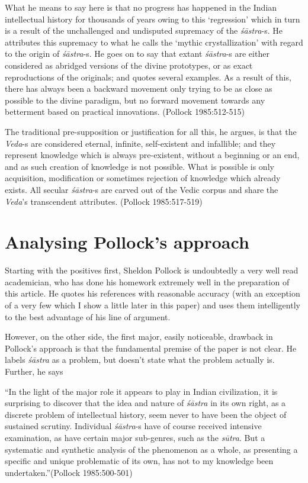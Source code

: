 What he means to say here is that no progress has happened in the Indian intellectual history for thousands of years owing to this `regression' which in turn is a result of the unchallenged and undisputed supremacy of the {\it śāstra}-s. He attributes this supremacy to what he calls the `mythic crystallization' with regard to the origin of {\it śāstra}-s. He goes on to say that extant {\it śāstra}-s are either considered as abridged versions of the divine prototypes, or as exact reproductions of the originals; and quotes several examples. As a result of this, there has always been a backward movement only trying to be as close as possible to the divine paradigm, but no forward movement towards any betterment based on practical innovations. (Pollock 1985:512-515)

The traditional pre-supposition or justification for all this, he argues, is that the {\it Veda}-s are considered eternal, infinite, self-existent and infallible; and they represent knowledge which is always pre-existent, without a beginning or an end, and as such creation of knowledge is not possible. What is possible is only acquisition, modification or sometimes rejection of knowledge which already exists. All secular {\it śāstra}-s are carved out of the Vedic corpus and share the {\it Veda}'s transcendent attributes. (Pollock 1985:517-519)

\section*{Analysing Pollock's approach}

Starting with the positives first, Sheldon Pollock is undoubtedly a very well read academician, who has done his homework extremely well in the preparation of this article. He quotes his references with reasonable accuracy (with an exception of a very few which I show a little later in this paper) and uses them intelligently to the best advantage of his line of argument. 

However, on the other side, the first major, easily noticeable, drawback in Pollock's approach is that the fundamental premise of the paper is not clear. He labels {\it śāstra} as a problem, but doesn't state what the problem actually is. Further, he says
\begin{myquote}
``In the light of the major role it appears to play in Indian civilization, it is surprising to discover that the idea and nature of {\sl śāstra} in its own right, as a discrete problem of intellectual history, seem never to have been the object of sustained scrutiny. Individual {\sl śāstra}-s have of course received intensive examination, as have certain major sub-genres, such as the {\sl sūtra}. But a systematic and synthetic analysis of the phenomenon as a whole, as presenting a specific and unique problematic of its own, has not to my knowledge been undertaken.''\hfill (Pollock 1985:500-501)
\end{myquote}

